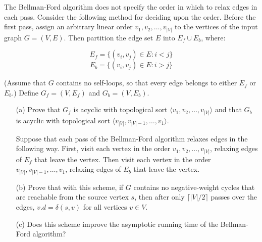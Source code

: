 \documentclass[10pt,letter,notitlepage]{article}
\newcounter{exercise}
\begin{document}
\begin{exercise}[(20 marks)]
The Bellman-Ford algorithm does not specify the order in which to relax edges in each pass. Consider the following method for deciding upon the order. Before the first pass, assign an arbitrary linear order \(v_1, v_2, \ldots, v_{|V|}\) to the vertices of the input graph \(G = (V, E)\). Then partition the edge set \(E\) into \(E_f \cup E_b\), where:

\[
E_f = \{(v_i, v_j) \in E : i < j\}
\]
\[
E_b = \{(v_i, v_j) \in E : i > j\}
\]

(Assume that \(G\) contains no self-loops, so that every edge belongs to either \(E_f\) or \(E_b\).) Define \(G_f = (V, E_f)\) and \(G_b = (V, E_b)\).

\begin{enumerate}
    \item[(a)] Prove that \(G_f\) is acyclic with topological sort \(\langle v_1, v_2, \ldots, v_{|V|} \rangle\) and that \(G_b\) is acyclic with topological sort \(\langle v_{|V|}, v_{|V|-1}, \ldots, v_1 \rangle\).

    Suppose that each pass of the Bellman-Ford algorithm relaxes edges in the following way. First, visit each vertex in the order \(v_1, v_2, \ldots, v_{|V|}\), relaxing edges of \(E_f\) that leave the vertex. Then visit each vertex in the order \(v_{|V|}, v_{|V|-1}, \ldots, v_1\), relaxing edges of \(E_b\) that leave the vertex.

    \item[(b)] Prove that with this scheme, if \(G\) contains no negative-weight cycles that are reachable from the source vertex \(s\), then after only \(\lceil |V|/2 \rceil\) passes over the edges, \(v.d = \delta(s, v)\) for all vertices \(v \in V\).

    \item[(c)] Does this scheme improve the asymptotic running time of the Bellman-Ford algorithm?
\end{enumerate}
\end{exercise}
\end{document}

